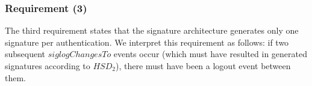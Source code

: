 \documentclass[a4paper,pdftex]{article}
\begin{document}

\subsubsection{Requirement (3)}

The third requirement states that the signature architecture
generates only one signature per authentication.  We
interpret this requirement as follows:
if two subsequent $siglogChangesTo$ events occur (which
must have resulted in generated signatures according to $HSD_2$), there must
have been a logout event between them.
\end{document}
